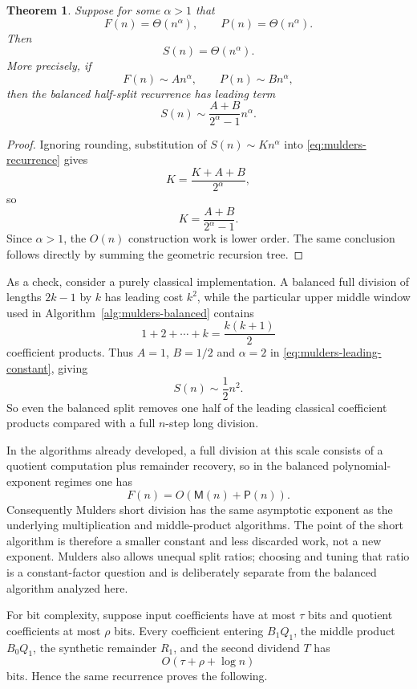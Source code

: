 \documentclass[11pt]{book}
\newtheorem{theorem}{Theorem}[section]
\theoremstyle{definition}
\begin{document}
\begin{theorem}\label{thm:mulders-complexity}
Suppose for some $\alpha>1$ that
\[
 F(n)=\Theta(n^\alpha),
 \qquad
 P(n)=\Theta(n^\alpha).
\]
Then
\[
 S(n)=\Theta(n^\alpha).
\]
More precisely, if
\[
 F(n)\sim A n^\alpha,
 \qquad
 P(n)\sim B n^\alpha,
\]
then the balanced half-split recurrence has leading term
\begin{equation}\label{eq:mulders-leading-constant}
 S(n)\sim \frac{A+B}{2^\alpha-1}n^\alpha.
\end{equation}
\end{theorem}

\begin{proof}
Ignoring rounding, substitution of $S(n)\sim Kn^\alpha$ into
\eqref{eq:mulders-recurrence} gives
\[
 K=\frac{K+A+B}{2^\alpha},
\]
so
\[
 K=\frac{A+B}{2^\alpha-1}.
\]
Since $\alpha>1$, the $O(n)$ construction work is lower order.  The same
conclusion follows directly by summing the geometric recursion tree.
\end{proof}

As a check, consider a purely classical implementation.  A balanced full
division of lengths $2k-1$ by $k$ has leading cost $k^2$, while the particular
upper middle window used in Algorithm~\ref{alg:mulders-balanced} contains
\[
 1+2+\cdots+k=\frac{k(k+1)}2
\]
coefficient products.  Thus $A=1$, $B=1/2$ and $\alpha=2$ in
\eqref{eq:mulders-leading-constant}, giving
\[
 S(n)\sim\frac12 n^2.
\]
So even the balanced split removes one half of the leading classical
coefficient products compared with a full $n$-step long division.

In the algorithms already developed, a full division at this scale consists of
a quotient computation plus remainder recovery, so in the balanced
polynomial-exponent regimes one has
\[
 F(n)=O(\mathsf M(n)+\mathsf P(n)).
\]
Consequently Mulders short division has the same asymptotic exponent as the
underlying multiplication and middle-product algorithms.  The point of the
short algorithm is therefore a smaller constant and less discarded work, not
a new exponent.  Mulders also allows unequal split ratios; choosing and tuning
that ratio is a constant-factor question and is deliberately separate from the
balanced algorithm analyzed here.

For bit complexity, suppose input coefficients have at most $\tau$ bits and
quotient coefficients at most $\rho$ bits.  Every coefficient entering
$B_1Q_1$, the middle product $B_0Q_1$, the synthetic remainder $R_1$, and the
second dividend $T$ has
\[
 O(\tau+\rho+\log n)
\]
bits.  Hence the same recurrence proves the following.
\end{document}
